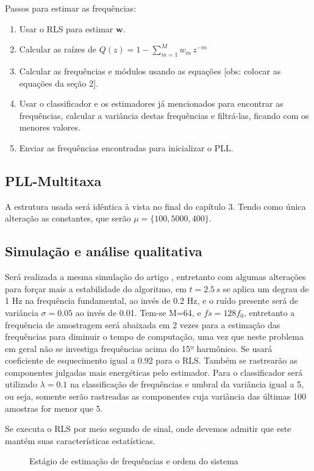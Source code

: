 Passos para estimar as frequências:

\begin{enumerate}
	\item Usar o RLS para estimar $\boldsymbol{w}$.
	\item Calcular as raízes de $Q(z)=1-\sum_{m=1}^{M}w_m \, z^{-m}$
	\item Calcular as frequências e módulos usando as equações [obs: colocar as equações da seção 2].
	\item Usar o classificador e os estimadores já mencionados para encontrar as frequências, calcular a variância destas frequências e filtrá-las, ficando com os menores valores.
	\item Enviar as frequências encontradas para inicializar o PLL.  
\end{enumerate}
	
\subsection{PLL-Multitaxa}
A estrutura usada será idêntica à vista no final do capítulo 3. Tendo como única alteração as constantes, que serão $\mu=\{100, 5000, 400\}$.

\subsection{Simulação e análise qualitativa}
Será realizada a mesma simulação do artigo \cite{chang2009two}, entretanto com algumas alterações para forçar mais a estabilidade do algoritmo, em $t=2.5 \, s$ se aplica um degrau de 1 Hz na frequência fundamental, ao invés de 0.2 Hz, e o ruído presente será de variância $\sigma=0.05$ ao invés de 0.01. Tem-se M=64, e $fs=128f_0$, entretanto a frequência de amostragem será abaixada em 2 vezes para a estimação das frequências para diminuir o tempo de computação, uma vez que neste problema em geral não se investiga frequências acima do 15º harmônico. Se usará coeficiente de esquecimento igual a 0.92 para o RLS. Também se rastrearão as componentes julgadas mais energéticas pelo estimador. Para o classificador será utilizado $\lambda=0.1$ na classificação de frequências e umbral da variância igual a 5, ou seja, somente serão rastreadas as componentes cuja variância das últimas 100 amostras for menor que 5. 

Se executa o RLS por meio segundo de sinal, onde devemos admitir que este mantém suas características estatísticas.

\begin{figure}[H]
	\centering    
	\def\svgwidth{\columnwidth}
	
	\caption{Estágio de estimação de frequências e ordem do sistema}
	\label{fig:estagio_1}
\end{figure}

